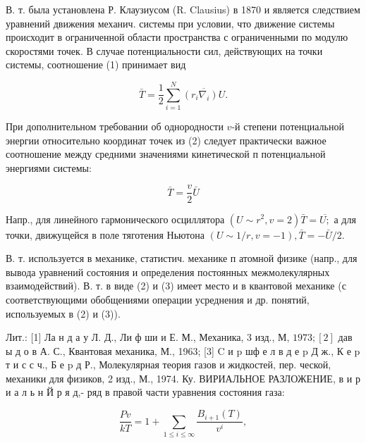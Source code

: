\documentclass[10pt]{article}
\begin{document}
В. т. была установлена Р. Клаузиусом (R. Clausius) в 1870 и является следствием уравнений движения механич. системы при условии, что движение системы происходит в ограниченной области пространства с ограниченными по модулю скоростями точек. В случае потенциальности сил, действующих на точки системы, соотношение (1) принимает вид



\[

\bar{T}=\frac{1}{2} \sum_{i=1}^{N} \overline{\left(r_{i} \nabla_{i}\right) U} .

\]



При дополнительном требовании об однородности $v$-й степени потенциальной энергии относительно координат точек из (2) следует практически важное соотношение между средними значениями кинетической п потенциальной энергиями системы:



\[

\bar{T}=\frac{v}{2} \bar{U}

\]



Напр., для линейного гармонического осциллятора $\left(U \sim r^{2}, v=2\right) \bar{T}=\overline{U ;}$ а для точки, движущейся в поле тяготения Ньютона $(U \sim 1 / r, v=-1), \bar{T}=-\bar{U} / 2$.



В. т. используется в механике, статистич. механике п атомной физике (напр., для вывода уравнений состояния и определения постоянных межмолекулярных взаимодействий). В. т. в виде (2) и (3) имеет место и в квантовой механике (с соответствующими обобщениями операции усреднения и др. понятий, используемых в (2) и (3)).



Лит.: [1] Ла н д а у Л. Д., Ли ф ши и Е. М., Механика, 3 изд., М, $1973 ;[2]$ дав ы д о в А. С., Квантовая механика, М., 1963; [3] $\mathrm{C}$ и $\mathrm{p}$ шф е л в д е $\mathrm{p}$ Д ж., К е $\mathrm{p}$ т и с с ч., Б е p д Р., Молекулярная теория газов и жидкостей, пер. ческой, механики для физиков, 2 изд., М., 1974. Ку. ВИРИАЛЬНОЕ РАЗЛОЖЕНИЕ, в и р и а л ь н Й р я д,- ряд в правой части уравнения состояния газа:



\[

\frac{P v}{k T}=1+\sum_{1 \leqslant i \leqslant \infty} \frac{B_{i+1}(T)}{v^{i}},

\]
\end{document}
